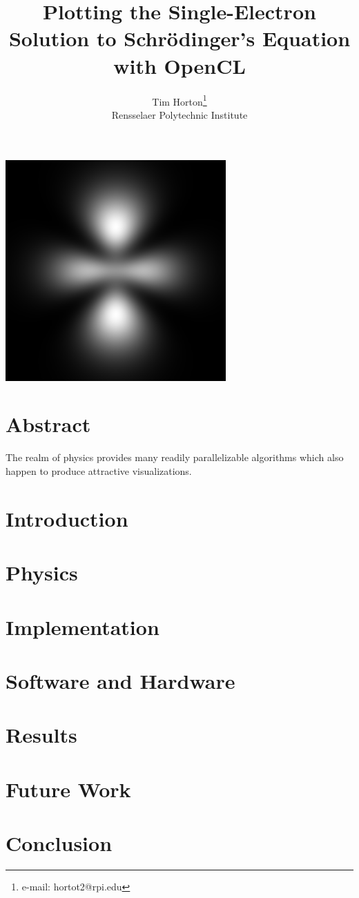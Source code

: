 \documentclass{acmsiggraph}
\title{Plotting the Single-Electron Solution to Schr\"{o}dinger's Equation with OpenCL}
\author{Tim Horton\thanks{e-mail: hortot2@rpi.edu}\\Rensselaer Polytechnic Institute}
\begin{document}
\maketitle

\includegraphics[width=84.5mm]{320.png}

\section{Abstract}

The realm of physics provides many readily parallelizable algorithms which also happen to produce attractive visualizations.

\section{Introduction}

\section{Physics}

\section{Implementation}

\section{Software and Hardware}

\section{Results}

\section{Future Work}

\section{Conclusion}


\nocite{*}

\end{document}
